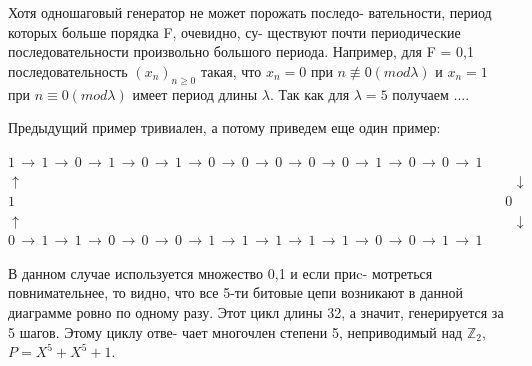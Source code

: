 \documentclass{../template/mai_book}
\begin{document}
\begin{mynotice}
Хотя одношаговый генератор не может порожать последо- \linebreak \indent вательности, период которых больше порядка F, очевидно, су- \linebreak \indent ществуют почти периодические последовательности произвольно \linebreak \indent большого периода. Например, для F = {0,1} последовательность \linebreak \indent $(x_{n})_{n \geqslant 0}$ такая, что $x_{n} = 0$ при $n \not\equiv 0 (mod \lambda)$ и $x_{n} = 1$ при \linebreak \indent $n \equiv 0 (mod \lambda)$ имеет период длины $\lambda$. Так как для $\lambda = 5$ получаем \linebreak {}.... \par 
Предыдущий пример тривиален, а потому приведем еще один \linebreak пример: \par 
\noindent $1 \, \to \, 1 \, \to \, 0 \, \to \, 1 \, \to \, 0 \, \to \, 1 \, \to \, 0 \, \to \, 0 \, \to \, 0 \, \to \, 0 \, \to \, 0 \, \to \, 1 \, \to \, 0 \, \to \, 0 \, \to \, 1$ \linebreak
$\uparrow \;\;\;\;\;\;\;\;\;\;\;\;\;\;\;\;\;\;\;\;\;\;\;\;\;\;\;\;\;\;\;\;\;\;\;\;\;\;\;\;\;\;\;\;\;\;\;\;\;\;\;\;\;\;\;\;\;\;\;\;\;\;\;\;\;\;\;\;\;\;\;\;\;\;\;\;\;\;\;\;\;\;\;\;\;\;\;\;\;\;\;\;\;\;\;\;\;\;\;\;\;\;\;\;\;\;\;\;\;\;\;\;\;\;\;\;\;\;\;\;\;\;\;\;\;\;\downarrow$ \linebreak
$ 1 \;\;\;\;\;\;\;\;\;\;\;\;\;\;\;\;\;\;\;\;\;\;\;\;\;\;\;\;\;\;\;\;\;\;\;\;\;\;\;\;\;\;\;\;\;\;\;\;\;\;\;\;\;\;\;\;\;\;\;\;\;\;\;\;\;\;\;\;\;\;\;\;\;\;\;\;\;\;\;\;\;\;\;\;\;\;\;\;\;\;\;\;\;\;\;\;\;\;\;\;\;\;\;\;\;\;\;\;\;\;\;\;\;\;\;\;\;\;\;\;\;\;\;\;\;\; 0$ \linebreak
$\uparrow \;\;\;\;\;\;\;\;\;\;\;\;\;\;\;\;\;\;\;\;\;\;\;\;\;\;\;\;\;\;\;\;\;\;\;\;\;\;\;\;\;\;\;\;\;\;\;\;\;\;\;\;\;\;\;\;\;\;\;\;\;\;\;\;\;\;\;\;\;\;\;\;\;\;\;\;\;\;\;\;\;\;\;\;\;\;\;\;\;\;\;\;\;\;\;\;\;\;\;\;\;\;\;\;\;\;\;\;\;\;\;\;\;\;\;\;\;\;\;\;\;\;\;\;\;\;\downarrow$ \linebreak
\noindent $0 \, \to \, 1 \, \to \, 1 \, \to \, 0 \, \to \, 0 \, \to \, 0 \, \to \, 1 \, \to \, 1 \, \to \, 1 \, \to \, 1 \, \to \, 1 \, \to \, 0 \, \to \, 0 \, \to \, 1 \, \to \, 1$ \linebreak

\indent В данном случае используется множество {0,1} и если приc- \linebreak мотреться повнимательнее, то видно, что все 5-ти битовые цепи \linebreak возникают в данной диаграмме ровно по одному разу. Этот цикл \linebreak длины 32, а значит, генерируется за 5 шагов. Этому циклу отве- \linebreak чает многочлен степени 5, неприводимый над $\mathbb{Z}_{2}$, $P = X^{5} + X^{5} + 1$.
\end{mynotice}
\newpage
\end{document}
